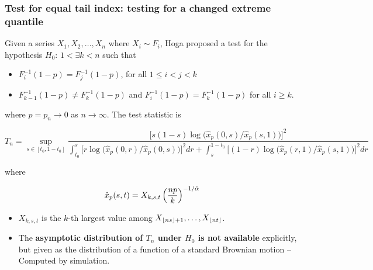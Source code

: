 \documentclass{beamer}
\begin{document}
\begin{frame}
  \frametitle{\small Test for equal tail index: testing for a
    changed extreme quantile}
  Given a series $X_1, X_2, \dots, X_n$ where $X_i \sim F_i$, Hoga
  \cite{hoga:2016} proposed a test for the hypothesis $H_0$:
  $1 < \exists k < n$ such that
  \begin{itemize}
    \item $F_i^{-1}(1 - p) = F_j^{-1}(1 - p)$, for all $1 \leq i < j < k$
    \item $F_{k-1}^{-1}(1 - p) \neq F_k^{-1}(1 - p)$ and
      $F_i^{-1}(1-p) = F_k^{-1}(1-p)$ for all $i \geq k$.
  \end{itemize}
  where $p = p_n \to 0$ as $n \to \infty$. The test statistic is
  \begin{tiny}
  \[
  T_n = \sup_{s \in [t_0, 1 - t_0]}
  \dfrac{  \big[s (1 - s) \log \big(\hat x_p(0, s)/\hat x_p(s, 1)\big)
      \big]^2}{
    \int_{t_0}^s\big[r \log \big( \hat x_p(0, r)/\hat x_p(0, s)
      \big)
      \big]^2 dr
    +
    \int_{s}^{1 - t_0}
    \big[
      (1 - r) \log \big(
      \hat x_p(r, 1)/
      \hat x_p(s, 1)
      \big)
      \big]^2 dr}
  \]
  \end{tiny}
  where
  \begin{small}
  \[
  \hat x_p(s, t) = X_{k, s, t}
  \left({n p \over k}\right)^{-1/{\hat \alpha}}
  \]
  \begin{itemize}
    \item $X_{k, s, t}$ is the $k$-th largest value among
      $X_{\lfloor n s\rfloor + 1}, \dots, X_{\lfloor n t\rfloor}$.
    \item   The {\bf asymptotic distribution of $T_n$ under $H_0$ is not
      available} explicitly, but given as the distribution of a
      function of a standard Brownian motion -- Computed by simulation.
  \end{itemize}
  \end{small}
\end{frame}
\end{document}
